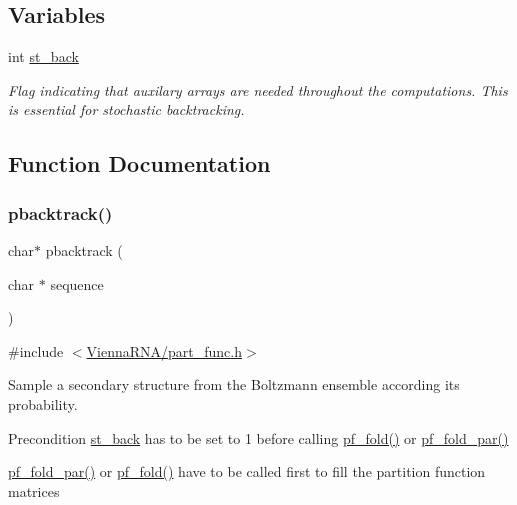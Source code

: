 \subsection*{Variables}
\begin{DoxyCompactItemize}
\item 
int \mbox{\hyperlink{group__subopt__stochbt__deprecated_gacd79b1a570e6ad9be24cb11fe8cae30a}{st\+\_\+back}}
\begin{DoxyCompactList}\small\item\em Flag indicating that auxilary arrays are needed throughout the computations. This is essential for stochastic backtracking. \end{DoxyCompactList}\end{DoxyCompactItemize}


\subsection{Function Documentation}
\mbox{\label{group__subopt__stochbt__deprecated_gac03ca6db186bb3bf0a2a326d7fb3ba03}} 
\subsubsection{\texorpdfstring{pbacktrack()}{pbacktrack()}}
{\footnotesize\ttfamily char$\ast$ pbacktrack (\begin{DoxyParamCaption}\item[{char $\ast$}]{sequence }\end{DoxyParamCaption})}



{\ttfamily \#include $<$\mbox{\hyperlink{part__func_8h}{Vienna\+R\+N\+A/part\+\_\+func.\+h}}$>$}



Sample a secondary structure from the Boltzmann ensemble according its probability. 

\begin{DoxyPrecond}{Precondition}
\mbox{\hyperlink{group__subopt__stochbt__deprecated_gacd79b1a570e6ad9be24cb11fe8cae30a}{st\+\_\+back}} has to be set to 1 before calling \mbox{\hyperlink{group__part__func__global__deprecated_gadc3db3d98742427e7001a7fd36ef28c2}{pf\+\_\+fold()}} or \mbox{\hyperlink{group__part__func__global__deprecated_gac4f95bee734b2563a3d6e9932117ebdf}{pf\+\_\+fold\+\_\+par()}} 

\mbox{\hyperlink{group__part__func__global__deprecated_gac4f95bee734b2563a3d6e9932117ebdf}{pf\+\_\+fold\+\_\+par()}} or \mbox{\hyperlink{group__part__func__global__deprecated_gadc3db3d98742427e7001a7fd36ef28c2}{pf\+\_\+fold()}} have to be called first to fill the partition function matrices
\end{DoxyPrecond}

